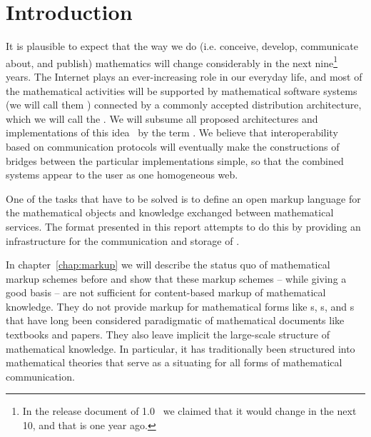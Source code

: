\chapter{Introduction}\label{sec:intro}

It is plausible to expect that the way we do (i.e. conceive, develop, communicate
about, and publish) mathematics will change considerably in the next
nine\footnote{In the release document of {\omdoc}1.0~\cite{Kohlhase:otormd00} we
  claimed that it would change in the next 10, and that is one year ago.} years.
The Internet plays an ever-increasing role in our everyday life, and most of the
mathematical activities will be supported by mathematical software systems (we
will call them {})
connected by a commonly accepted distribution architecture, which we will call the
{}. We
will subsume all proposed architectures and implementations of this
idea~\cite{FraHes:aoidms99,FraKoh:mabdl99,DenCol:tpt00,ArmZin:timrs00} by the term
{\mathweb}. We believe that interoperability based
on communication protocols will eventually make the constructions of bridges
between the particular implementations simple, so that the combined systems appear
to the user as one homogeneous web.

One of the tasks that have to be solved is to define an open markup language for
the mathematical objects and knowledge exchanged between mathematical services.
The {\omdoc} format presented in this report attempts to do this by providing an
infrastructure for the communication and storage of {}.

In chapter~\ref{chap:markup} we will describe the status quo of mathematical
markup schemes before {\omdoc} and show that these markup schemes -- while giving
a good basis -- are not sufficient for content-based markup of mathematical
knowledge. They do not provide markup for mathematical forms like
{s}, {s}, and {s} that have long
been considered paradigmatic of mathematical documents like textbooks and papers.
They also leave implicit the large-scale structure of mathematical knowledge. In
particular, it has traditionally been structured into mathematical
theories that serve as a situating
{} for all forms of mathematical communication.

